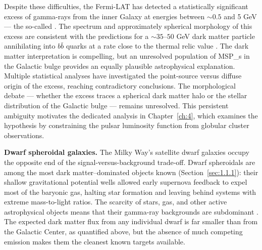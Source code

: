 Despite these difficulties, the Fermi-LAT has detected a statistically significant excess of gamma-rays from the inner Galaxy at energies between $\sim 0.5$ and 5 GeV --- the so-called \GCE \cite{Goodenough:2009gk,Hooper:2010mq,Daylan:2014rsa}.
The spectrum and approximately spherical morphology of this excess are consistent with the predictions for a $\sim 35$--$50$ GeV dark matter particle annihilating into $b\bar{b}$ quarks at a rate close to the thermal relic value \cite{Daylan:2014rsa}.
The dark matter interpretation is compelling, but an unresolved population of \glspl{MSP_} in the Galactic bulge provides an equally plausible astrophysical explanation.
Multiple statistical analyses have investigated the point-source versus diffuse origin of the excess, reaching contradictory conclusions.
The morphological debate --- whether the excess traces a spherical dark matter halo or the stellar distribution of the Galactic bulge --- remains unresolved.
This persistent ambiguity motivates the dedicated analysis in Chapter~\ref{ch:4}, which examines the \MSP hypothesis by constraining the pulsar luminosity function from globular cluster observations.

\textbf{Dwarf spheroidal galaxies.}
The Milky Way's satellite dwarf galaxies occupy the opposite end of the signal-versus-background trade-off.
Dwarf spheroidals are among the most dark matter--dominated objects known (Section~\ref{sec:1.1.1}): their shallow gravitational potential wells allowed early supernova feedback to expel most of the baryonic gas, halting star formation and leaving behind systems with extreme mass-to-light ratios.
The scarcity of stars, gas, and other active astrophysical objects means that their gamma-ray backgrounds are subdominant \cite{Cirelli:2024ssz}.
The expected dark matter flux from any individual dwarf is far smaller than from the Galactic Center, as quantified above, but the absence of much competing emission makes them the cleanest known targets available.

